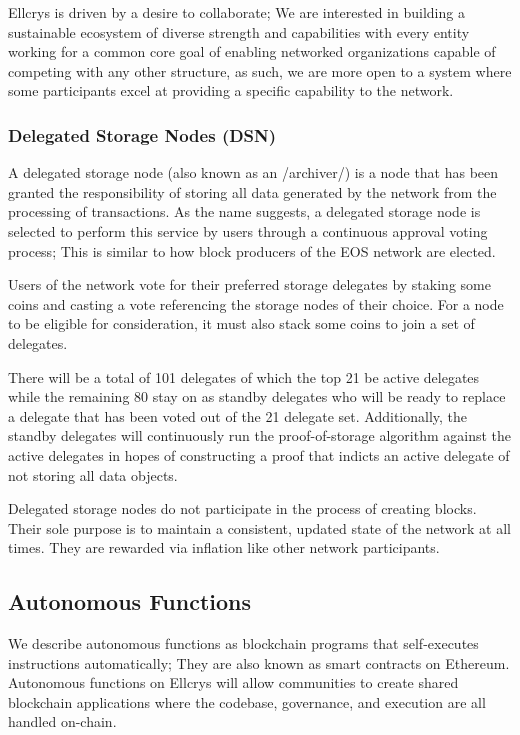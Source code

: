Ellcrys is driven by a desire to collaborate; We are interested in building a sustainable ecosystem of diverse strength and capabilities with every entity working for a common core goal of enabling networked organizations capable of competing with any other structure, as such, we are more open to a system where some participants excel at providing a specific capability to the network.

\subsubsection{Delegated Storage Nodes (DSN)}
A delegated storage node (also known as an /archiver/) is a node that has been granted the responsibility of storing all data generated by the network from the processing of transactions. As the name suggests, a delegated storage node is selected to perform this service by users through a continuous approval voting process; This is similar to how block producers of the EOS network are elected.

Users of the network vote for their preferred storage delegates by staking some coins and casting a vote referencing the storage nodes of their choice. For a node to be eligible for consideration, it must also stack some coins to join a set of delegates.

There will be a total of 101 delegates of which the top 21 be active delegates while the remaining 80 stay on as standby delegates who will be ready to replace a delegate that has been voted out of the 21 delegate set. Additionally, the standby delegates will continuously run the proof-of-storage algorithm against the active delegates in hopes of constructing a proof that indicts an active delegate of not storing all data objects.

Delegated storage nodes do not participate in the process of creating blocks. Their sole purpose is to maintain a consistent, updated state of the network at all times. They are rewarded via inflation like other network participants.

\subsection{Autonomous Functions}
We describe autonomous functions as blockchain programs that self-executes instructions automatically; They are also known as smart contracts on Ethereum. Autonomous functions on Ellcrys will allow communities to create shared blockchain applications where the codebase, governance, and execution are all handled on-chain.

